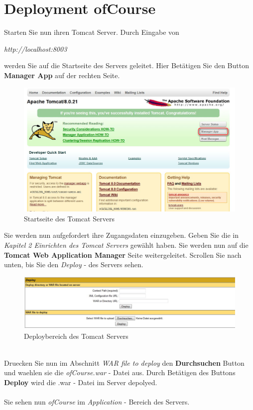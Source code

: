 \documentclass[a4paper, 12pt]{scrreprt}
\begin{document}
\chapter{Deployment ofCourse}
Starten Sie nun ihren Tomcat Server. Durch Eingabe von
\begin{center}
		{\it http://localhost:8003}
\end{center}
werden Sie auf die Startseite des Servers geleitet. Hier Betätigen Sie den Button \textbf{Manager App} auf der rechten Seite.
\begin{figure}[h]
\centering
\includegraphics[width=0.8\linewidth]{Grafiken/ServerStartPage}
\caption{Startseite des Tomcat Servers}
\label{fig:ServerStartPage}
\end{figure}
Sie werden nun aufgefordert ihre Zugangsdaten einzugeben. Geben Sie die in {\it Kapitel 2 Einrichten des Tomcat Servers} gewählt haben. Sie werden nun auf die \textbf{Tomcat Web Application Manager} Seite weitergeleitet.
Scrollen Sie nach unten, bis Sie den {\it Deploy} - des Servers sehen.
\begin{figure}[h]
\centering
\includegraphics[width=0.7\linewidth]{Grafiken/ServerDeploy}
\caption{Deploybereich des Tomcat Servers}
\label{fig:ServerDeploy}
\end{figure}
\\
Druecken Sie nun im Abschnitt {\it WAR file to deploy} den \textbf{Durchsuchen} Button und waehlen sie die {\it ofCourse.war} - Datei aus. Durch Betätigen des Buttons \textbf{Deploy} wird die .war - Datei im Server depolyed.\\
\ \\
Sie sehen nun {\it ofCourse} im {\it Application} - Bereich des Servers.
\end{document}
